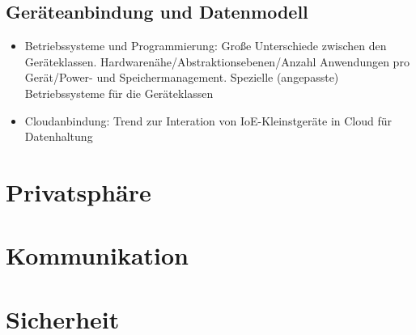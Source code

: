 \subsection{Geräteanbindung und Datenmodell}
\begin{itemize}
	\item Betriebssysteme und Programmierung: Große Unterschiede zwischen den Geräteklassen. Hardwarenähe/Abstraktionsebenen/Anzahl Anwendungen pro Gerät/Power- und Speichermanagement. Spezielle (angepasste) Betriebssysteme für die Geräteklassen
	\item Cloudanbindung: Trend zur Interation von IoE-Kleinstgeräte in Cloud für Datenhaltung
\end{itemize}



\section{Privatsphäre}



\section{Kommunikation}



\section{Sicherheit}